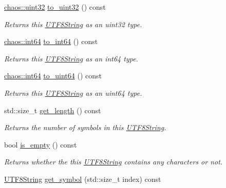 \begin{DoxyCompactItemize}
\hyperlink{namespacechaos_a8641b3ae4551f0b35570d4f9f4ec22d9}{chaos\+::uint32} \hyperlink{classchaos_1_1uni_1_1_u_t_f8_string_aa752c6db6c5a4f62c0c158d0bf7c0742}{to\+\_\+uint32} () const 
\begin{DoxyCompactList}\small\item\em Returns this \hyperlink{classchaos_1_1uni_1_1_u_t_f8_string}{U\+T\+F8\+String} as an uint32 type. \end{DoxyCompactList}\item 
\hyperlink{namespacechaos_aa4cfe70894188e01134a2694db2eb2db}{chaos\+::int64} \hyperlink{classchaos_1_1uni_1_1_u_t_f8_string_ac9db9e86ffa8572ba7ecf576d764d89f}{to\+\_\+int64} () const 
\begin{DoxyCompactList}\small\item\em Returns this \hyperlink{classchaos_1_1uni_1_1_u_t_f8_string}{U\+T\+F8\+String} as an int64 type. \end{DoxyCompactList}\item 
\hyperlink{namespacechaos_aa4cfe70894188e01134a2694db2eb2db}{chaos\+::int64} \hyperlink{classchaos_1_1uni_1_1_u_t_f8_string_afe8cb74c9fef1767790a33af2179a0b4}{to\+\_\+uint64} () const 
\begin{DoxyCompactList}\small\item\em Returns this \hyperlink{classchaos_1_1uni_1_1_u_t_f8_string}{U\+T\+F8\+String} as an uint64 type. \end{DoxyCompactList}\item 
std\+::size\+\_\+t \hyperlink{classchaos_1_1uni_1_1_u_t_f8_string_a9e0ec9cb771652c5ad61e2b54cf8b2aa}{get\+\_\+length} () const 
\begin{DoxyCompactList}\small\item\em Returns the number of symbols in this \hyperlink{classchaos_1_1uni_1_1_u_t_f8_string}{U\+T\+F8\+String}. \end{DoxyCompactList}\item 
bool \hyperlink{classchaos_1_1uni_1_1_u_t_f8_string_ad99ed42fcbd51651e6d626bab469af59}{is\+\_\+empty} () const 
\begin{DoxyCompactList}\small\item\em Returns whether the this \hyperlink{classchaos_1_1uni_1_1_u_t_f8_string}{U\+T\+F8\+String} contains any characters or not. \end{DoxyCompactList}\item 
\hyperlink{classchaos_1_1uni_1_1_u_t_f8_string}{U\+T\+F8\+String} \hyperlink{classchaos_1_1uni_1_1_u_t_f8_string_ae286e5ec21f22f709777dd7ecd55e05e}{get\+\_\+symbol} (std\+::size\+\_\+t index) const 

\end{DoxyCompactItemize}
